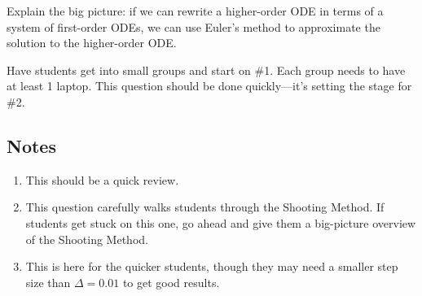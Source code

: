 Explain the big picture: if we can rewrite a higher-order ODE in terms of a system of first-order ODEs, 
we can use Euler's method to approximate the solution to the higher-order ODE.

Have students get into small groups and start on \#1. Each group needs to have at least 1 laptop.
This question should be done quickly---it's setting the stage for \#2.




\subsection*{Notes}

	\begin{enumerate}
		\item This should be a quick review.
		\item This question carefully walks students through the Shooting Method. If students get stuck on
		this one, go ahead and give them a big-picture overview of the Shooting Method.
		\item This is here for the quicker students, though they may need a smaller step size than $\Delta=0.01$ to get good results.
	\end{enumerate}





